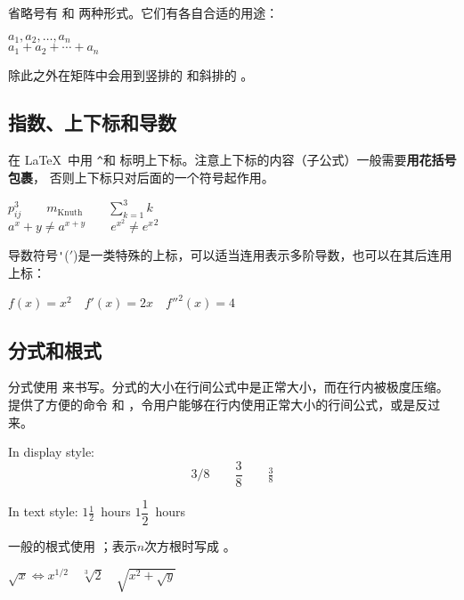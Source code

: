 省略号有  和  两种形式。它们有各自合适的用途：
\begin{example}
$a_1, a_2, \dots, a_n$ \\
$a_1 + a_2 + \cdots + a_n$
\end{example}

除此之外在矩阵中会用到竖排的  和斜排的 。

\subsection{指数、上下标和导数}\label{subsec:math-scripts}

在 \LaTeX\ 中用 \texttt\textasciicircum 和 \texttt\textunderscore 标明上下标。注意上下标的内容（子公式）一般需要\textbf{用花括号包裹}，
否则上下标只对后面的一个符号起作用。
\begin{example}
$p^3_{ij} \qquad
m_\mathrm{Knuth}\qquad
\sum_{k=1}^3 k $\\[5pt]
$a^x+y \neq a^{x+y}\qquad
e^{x^2} \neq {e^x}^2$
\end{example}

导数符号\texttt'(${}'$)是一类特殊的上标，可以适当连用表示多阶导数，也可以在其后连用上标：
\begin{example}
$f(x) = x^2 \quad f'(x)
= 2x \quad f''^{2}(x) = 4$
\end{example}

\subsection{分式和根式}\label{subsec:frac-sqrt}

分式使用  来书写。分式的大小在行间公式中是正常大小，而在行内被极度压缩。
 提供了方便的命令  和 ，令用户能够在行内使用正常大小的行间公式，或是反过来。
\begin{example}
In display style:
\[
3/8 \qquad \frac{3}{8}
\qquad \tfrac{3}{8}
\]
\end{example}
\begin{example}
In text style:
$1\frac{1}{2}$~hours \qquad
$1\dfrac{1}{2}$~hours
\end{example}

一般的根式使用 ；表示$n$次方根时写成 。
\begin{example}
$\sqrt{x} \Leftrightarrow x^{1/2}
\quad \sqrt[3]{2}
\quad \sqrt{x^{2} + \sqrt{y}}$
\end{example}

